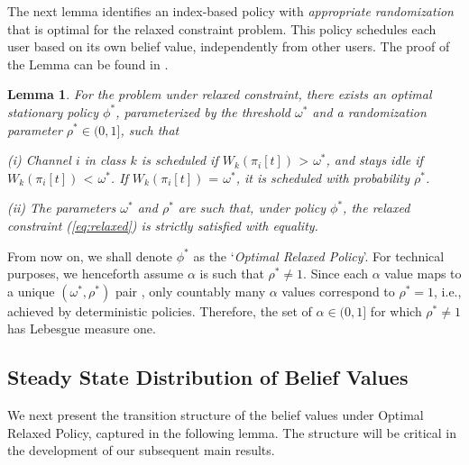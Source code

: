 \documentclass[11pt,twocolumn]{IEEEtran}
\newtheorem{lemma}{Lemma}
\begin{document}
The next lemma identifies an index-based policy with \emph{appropriate randomization} that is optimal for the relaxed constraint problem. This policy schedules each user based on its own belief value, independently from other users. The proof of the Lemma can be found in \cite{Zhao_index}.

\begin{lemma}
\label{lemma:thres_relax}
For the problem under relaxed constraint, there exists an optimal stationary policy $\phi^*$, parameterized by the threshold $\omega^*$ and a randomization parameter $\rho^* {\in} (0,1]$, such that
\vspace{3pt}

\noindent(i) Channel $i$ in class $k$ is scheduled if
$W_k(\pi_i[t])\hspace{1pt}{>}\hspace{1pt}\omega^*$, and stays idle
if \hspace{3pt}$W_k(\pi_i[t])\hspace{1pt}{<}\hspace{1pt}\omega^*$.
If $W_k(\pi_i[t])\hspace{1pt}{=}\hspace{1pt}\omega^*$, it is
scheduled with probability $\rho^*$.

\vspace{3pt}

\noindent(ii) The parameters $\omega^*$ and $\rho^*$ are such that,
under policy $\phi^*$, the relaxed constraint (\ref{eq:relaxed}) is
strictly satisfied with equality.

\end{lemma}

From now on, we shall denote $\phi^*$ as the `\emph{Optimal Relaxed
Policy}'. {For technical purposes, we henceforth assume $\alpha$ is such that $\rho^*{\neq} 1$}. Since each $\alpha$ value maps to a unique $(\omega^*, \rho^*)$ pair \cite{Wenzhuo_wiopt}, only countably many $\alpha$ values correspond to $\rho^*{=} 1$, i.e., achieved by deterministic policies. Therefore, the set of $\alpha {\in} (0,1]$ for which $\rho^*{\neq} 1$ has Lebesgue measure one.

\subsection{Steady State Distribution of Belief Values}

We next present the transition structure of the belief values under
Optimal Relaxed Policy, captured in the following lemma. The
structure will be critical in the development of our subsequent
main results.
\end{document}

